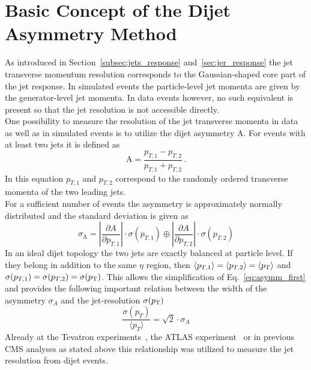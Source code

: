 \section{Basic Concept of the Dijet Asymmetry Method}
\label{sec:jer_method}
As introduced in Section~\ref{subsec:jets_response} and~\ref{sec:jer_response} the jet transverse momentum resolution corresponds to the Gaussian-shaped core part of the jet response. In simulated events the particle-level jet momenta are given by the generator-level jet momenta. In data events however,  no such equivalent is present so that the jet resolution is not accessible directly. \\
One possibility to measure the resolution of the jet transverse momenta in data as well as in simulated events is to utilize the dijet asymmetry A. For events with at least two jets it is defined as
\begin{equation}
\label{eq:asymmdef}
  \mathrm{A} = \frac{p_{T,1} - p_{T,2}}{p_{T,1} + p_{T,2}} \, .
 \end{equation}
 In this equation $p_{T,1}$ and $p_{T,2}$ correspond to the randomly ordered transverse momenta of the two leading jets. \\
 For a sufficient number of events the asymmetry is approximately normally distributed and the standard deviation is given as
 \begin{equation}
 \label{eq:asymm_first}
  {\sigma_{\mathrm{A}}} = \left\lvert \frac{\partial A}{\partial p_{T,1}} \right\rvert \cdot \sigma(p_{T,1}) \oplus  \left\lvert \frac{\partial A}{\partial p_{T,2}} \right\rvert \cdot \sigma(p_{T,2})
 \end{equation}
 In an ideal dijet topology the two jets are exactly balanced at particle level. If they belong in addition to the same $\eta$ region, then $\langle p_{T,1} \rangle = \langle p_{T,2} \rangle = \langle p_{\text{T}} \rangle$ and $\sigma (p_{T,1}) = \sigma (p_{T,2}) = \sigma (p_{\text{T}})$. This allows the simplification of Eq.~\ref{eq:asymm_first} and provides the following important relation between the width of the asymmetry $\sigma_{A}$ and the jet-\pt resolution $\sigma (p_{\text{T}})$
 \begin{equation}
 \label{eq:asymm}
  \frac{\sigma (p_{T})}{\langle p_{T} \rangle} = \sqrt{2} \cdot \sigma_{A}
 \end{equation}
Already at the Tevatron experiments~\cite{oai:arXiv.org:hep-ex/0012046, JetsD0}, the ATLAS experiment~\cite{Aad:2012ag} or in previous CMS analyses as stated above this relationship was utilized to measure the jet resolution from dijet events.  

